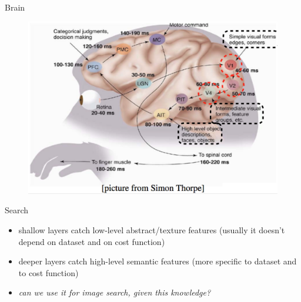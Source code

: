 \documentclass{beamer}
\begin{document}
\begin{frame}{Brain}

\begin{figure}[h!]
  \centering
  \includegraphics[width=1\textwidth]{images/brain.png}
\end{figure}

\end{frame}


\begin{frame}{Search}

\begin{itemize}
\item shallow layers catch low-level abstract/texture features (usually it doesn't depend on dataset and on cost function)
\item deeper layers catch high-level semantic features (more specific to dataset and to cost function)
\item \textit{can we use it for image search, given this knowledge?}
\end{itemize}

\end{frame}
\end{document}
